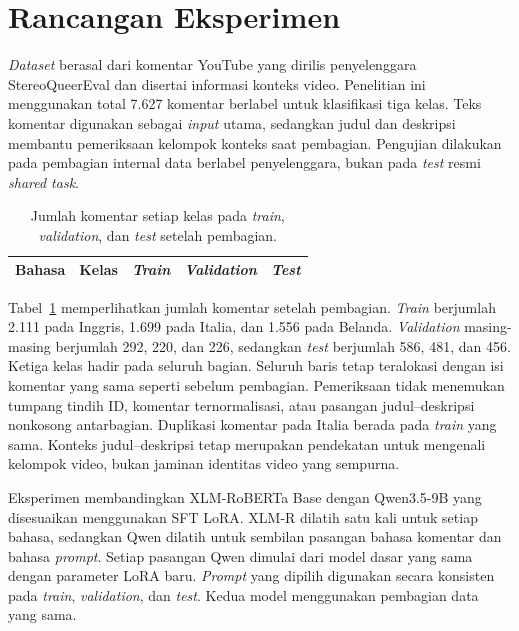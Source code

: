 \documentclass[11pt]{article}
\begin{document}
\section{Rancangan Eksperimen}
\textit{Dataset} berasal dari komentar YouTube yang dirilis penyelenggara StereoQueerEval dan disertai informasi konteks video. Penelitian ini menggunakan total 7.627 komentar berlabel untuk klasifikasi tiga kelas. Teks komentar digunakan sebagai \textit{input} utama, sedangkan judul dan deskripsi membantu pemeriksaan kelompok konteks saat pembagian. Pengujian dilakukan pada pembagian internal data berlabel penyelenggara, bukan pada \textit{test} resmi \textit{shared task}.

\begin{table}[ht]
\centering
\small
\setlength{\tabcolsep}{3pt}
\begin{tabular}{llrrr}
\toprule
Bahasa & Kelas & \textit{Train} & \textit{Validation} & \textit{Test} \\
\midrule

\end{tabular}
\caption{Jumlah komentar setiap kelas pada \textit{train}, \textit{validation}, dan \textit{test} setelah pembagian.}
\label{tab:split}
\end{table}

Tabel~\ref{tab:split} memperlihatkan jumlah komentar setelah pembagian. \textit{Train} berjumlah 2.111 pada Inggris, 1.699 pada Italia, dan 1.556 pada Belanda. \textit{Validation} masing-masing berjumlah 292, 220, dan 226, sedangkan \textit{test} berjumlah 586, 481, dan 456. Ketiga kelas hadir pada seluruh bagian. Seluruh baris tetap teralokasi dengan isi komentar yang sama seperti sebelum pembagian. Pemeriksaan tidak menemukan tumpang tindih ID, komentar ternormalisasi, atau pasangan judul--deskripsi nonkosong antarbagian. Duplikasi komentar pada Italia berada pada \textit{train} yang sama. Konteks judul--deskripsi tetap merupakan pendekatan untuk mengenali kelompok video, bukan jaminan identitas video yang sempurna.


Eksperimen membandingkan XLM-RoBERTa Base dengan Qwen3.5-9B yang disesuaikan menggunakan SFT LoRA. XLM-R dilatih satu kali untuk setiap bahasa, sedangkan Qwen dilatih untuk sembilan pasangan bahasa komentar dan bahasa \textit{prompt}. Setiap pasangan Qwen dimulai dari model dasar yang sama dengan parameter LoRA baru. \textit{Prompt} yang dipilih digunakan secara konsisten pada \textit{train}, \textit{validation}, dan \textit{test}. Kedua model menggunakan pembagian data yang sama.
\end{document}
